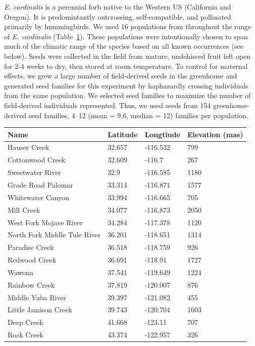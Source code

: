 \documentclass[11pt, oneside]{article}
\begin{document}
\textit{E. cardinalis} is a perennial forb native to the Western US (California and Oregon). It is predomintantly outcrossing, self-compatible, and pollinated primarily by hummingbirds. We used 16 populations from throughout the range of \textit{E. cardinalis} (Table~\ref{table:Table_FocalPops}). These populations were intentionally chosen to span much of the climatic range of the species based on all known occurrences (see below). Seeds were collected in the field from mature, undehisced fruit left open for 2-4 weeks to dry, then stored at room temperature. To control for maternal effects, we grew a large number of field-derived seeds in the greenhouse and generated seed families for this experiment by haphazardly crossing individuals from the same population. We selected seed families to maximize the number of field-derived individuals represented. Thus, we used seeds from 154 greenhouse-derived seed families, 4--12 (mean = 9.6, median = 12) families per population.



\begin{table}[ht]
   \centering
   \begin{tabular}{@{} llll @{}}
      \toprule
  Name  & Latitude  & Longtiude  & Elevation (mas) \\
      \midrule
	Hauser Creek & 32.657	& 
    -116.532	& 799   \\
	Cottonwood Creek	& 32.609 & 
    -116.7	& 267   \\
	Sweetwater River	& 32.9 & 
    -116.585	& 1180   \\
	Grade Road Palomar & 33.314 &
    -116.871	& 1577   \\
	Whitewater Canyon & 33.994 & 
    -116.665	& 705   \\
	Mill Creek	& 34.077 & 
    -116.873	& 2050   \\
	West Fork Mojave River	& 34.284 & 
    -117.378	& 1120   \\
	North Fork Middle Tule River	& 36.201 & 
    -118.651	& 1314   \\
	Paradise Creek	& 36.518 & 
    -118.759	& 926   \\
	Redwood Creek	& 36.691 & 
    -118.91	& 1727   \\
	Wawona  & 37.541 & 
    -119.649	& 1224   \\
	Rainbow Creek	& 37.819 & 
    -120.007	& 876   \\
	Middle Yuba River	& 39.397 & 
    -121.082	& 455   \\
	Little Jamison Creek	& 39.743 & 
    -120.704	& 1603   \\
	Deep Creek	& 41.668 & 
    -123.11	& 707   \\
	Rock Creek	& 43.374 & 
    -122.957	& 326   \\
	\bottomrule
	\end{tabular}
	\label{table:Table_FocalPops}
\end{table}
\end{document}
